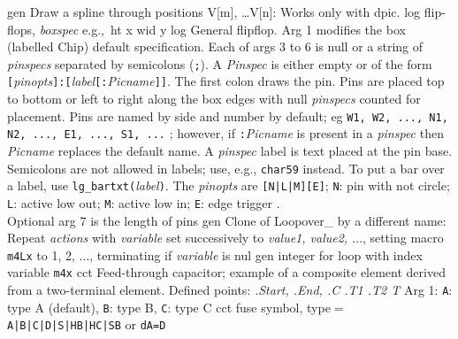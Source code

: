 %
  {gen}%
  {Draw a spline through positions V[m], \ldots V[n]: Works only with dpic.}%
%
  {log}%
  {flip-flops,
  {\sl boxspec} e.g.,\ ht x wid y }%
%
  {log}%
  {General flipflop.
   Arg 1 modifies the box (labelled Chip) default specification.
   Each of args 3 to 6 is null or a string of {\sl pinspecs}%
   separated by semicolons ({\tt;}).  A {\sl Pinspec} is either empty
   or of the form
   {\tt[}{\sl pinopts}{\tt]:[}{\sl label}{\tt[:}{\sl Picname}{\tt]]}.
   The first colon draws the pin.
   Pins are placed top to bottom or left to right along the box edges with
   null {\sl pinspecs} counted for placement. Pins are named by side and number
   by default; eg {\tt W1, W2, ..., N1, N2, ..., E1, ..., S1, ...} ; however,
   if {\tt:}{\sl Picname} is present in a {\sl pinspec} then {\sl Picname}%
   replaces the default name.
   A {\sl pinspec} label is text placed at the pin base. Semicolons are
   not allowed in labels; use, e.g., {\tt {}char59}%
   instead.
   To put a bar over a label, use {\tt lg\_bartxt(}{\sl label}{\tt)}.
   The {\sl pinopts} are {\tt[N|L|M][E]};
   {\tt N}: pin with not circle;
   {\tt L}: active low out;
   {\tt M}: active low in;
   {\tt E}: edge trigger .\\
   Optional arg 7 is the length of pins}%
%
  {gen}%
  {Clone of Loopover\_ by a different name:
   Repeat {\sl actions} with {\sl variable} set successively to
   {\sl value1, value2, $\ldots$}, setting macro {\tt m4Lx} to 1, 2,
   $\ldots$, terminating if {\sl variable} is nul}%
%
  {gen}%
  {integer for loop with index variable {\tt m4x} }%
%
  {cct}%
  {Feed-through capacitor; example of a composite element derived from
   a two-terminal element.  Defined points: {\sl .Start, .End, .C .T1 .T2 T}%
   Arg 1: {\tt A}:  type A (default),
   {\tt B}: type B,
   {\tt C}: type C 
   }%
%
  {cct}%
  {fuse symbol, type$=$
  {\tt  A|B|C|D|S|HB|HC|SB} or {\tt dA=D}}%
%
%
